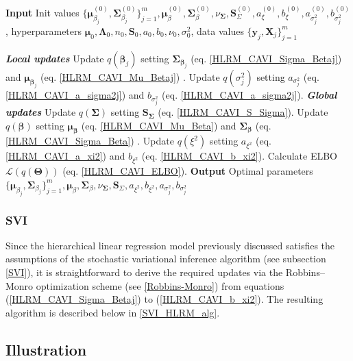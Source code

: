 \begin{algorithm}[H]
\caption{CAVI for HLRM}
\label{CAVI_HLRM_alg}
\begin{algorithmic}
\State \textbf{Input} Init values $\{\bm{\mu}_{\beta_j}^{(0)}, \bm{\Sigma}_{\beta_j}^{(0)}\}_{j=1}^m,\bm{\mu}_\beta^{(0)},\bm{\Sigma}_\beta^{(0)},\nu_{\bm{\Sigma}},\bm{S}_\Sigma^{(0)},a_\xi^{(0)}, b_\xi^{(0)},a_{\sigma_j^2}^{(0)}, b_{\sigma_j^2}^{(0)}$, hyperparameters $\bm{\mu}_0,\bm{\Lambda}_0,n_0,\bm{S}_0,a_0,b_0,\nu_0,\sigma_0^2$, data values $\{\bm{y}_j,\bm{X}_j\}_{j=1}^m$

  \State \textbf{\textit{Local updates}}
    \State Update $q (\bm{\beta}_j)$ setting $\bm{\Sigma}_{\bm{\beta}_j}$ (eq. \ref{HLRM_CAVI_Sigma_Betaj})  and $\bm{\mu}_{\bm{\beta}_j}$ (eq. \ref{HLRM_CAVI_Mu_Betaj}) .
\State Update $q(\sigma^2_j)$ setting $a_{\sigma_j^2}$ (eq. \ref{HLRM_CAVI_a_sigma2j}) and $b_{\sigma_j^2}$ (eq. \ref{HLRM_CAVI_a_sigma2j}).
  \EndFor
  \State \textbf{\textit{Global updates}}
    \State Update $q (\bm{\Sigma})$ setting $\bm{S}_{\bm{\Sigma}}$ (eq. \ref{HLRM_CAVI_S_Sigma}).
  \State Update $q (\bm{\beta})$ setting $\bm{\mu}_{\bm{\beta}}$ (eq. \ref{HLRM_CAVI_Mu_Beta}) and $\bm{\Sigma}_{\bm{\beta}}$ (eq. \ref{HLRM_CAVI_Sigma_Beta}) .
  \State Update $q (\xi^2)$ setting $a_{\xi^2}$ (eq. \ref{HLRM_CAVI_a_xi2}) and $b_{\xi^2}$ (eq. \ref{HLRM_CAVI_b_xi2}).
\State Calculate ELBO $\mathcal{L}(q(\bm{\Theta}))$ (eq. \ref{HLRM_CAVI_ELBO}).
\EndWhile
\State \textbf{Output} Optimal parameters $\{\bm{\mu}_{\beta_j}, \bm{\Sigma}_{\beta_j}\}_{j=1}^m,\bm{\mu}_\beta,\bm{\Sigma}_\beta,\nu_{\bm{\Sigma}},\bm{S}_\Sigma,a_{\xi^2}, b_{\xi^2},a_{\sigma_j^2}, b_{\sigma_j^2}$
\end{algorithmic}
\end{algorithm}

\subsubsection{SVI}

Since the hierarchical linear regression model  previously discussed satisfies the assumptions of
the stochastic variational inference algorithm (see subsection \ref{SVI}), it is straightforward to derive the required
updates via the Robbins--Monro optimization scheme (see \ref{Robbins-Monro}) from equations (\ref{HLRM_CAVI_Sigma_Betaj}) to (\ref{HLRM_CAVI_b_xi2}). The resulting algorithm is described below in \ref{SVI_HLRM_alg}.

\subsection{Illustration}
